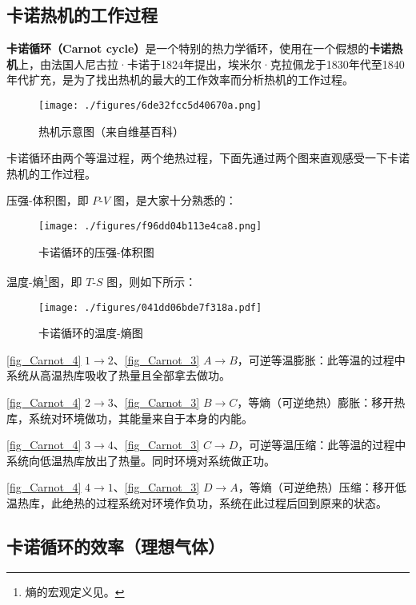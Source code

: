 


\subsection{卡诺热机的工作过程}
\textbf{卡诺循环（Carnot cycle）}是一个特别的热力学循环，使用在一个假想的\textbf{卡诺热机}上，由法国人尼古拉·卡诺于1824年提出，埃米尔·克拉佩龙于1830年代至1840年代扩充，是为了找出热机的最大的工作效率而分析热机的工作过程。

\begin{figure}[ht]
\centering
\texttt{[image: ./figures/6de32fcc5d40670a.png]}
\caption{热机示意图（来自维基百科）} \label{fig_Carnot_1}
\end{figure}
卡诺循环由两个等温过程，两个绝热过程，下面先通过两个图来直观感受一下卡诺热机的工作过程。

压强-体积图，即 $P$-$V$ 图，是大家十分熟悉的：

\begin{figure}[ht]
\centering
\texttt{[image: ./figures/f96dd04b113e4ca8.png]}
\caption{卡诺循环的压强-体积图} \label{fig_Carnot_4}
\end{figure}

温度-熵\footnote{熵的宏观定义见。}图，即 $T$-$S$ 图，则如下所示：
\begin{figure}[ht]
\centering
\texttt{[image: ./figures/041dd06bde7f318a.pdf]}
\caption{卡诺循环的温度-熵图} \label{fig_Carnot_3}
\end{figure}

\autoref{fig_Carnot_4} $1\to 2$、\autoref{fig_Carnot_3} $A\to B$，可逆等温膨胀：此等温的过程中系统从高温热库吸收了热量且全部拿去做功。

\autoref{fig_Carnot_4} $2\to 3$、\autoref{fig_Carnot_3} $B\to C$，等熵（可逆绝热）膨胀：移开热库，系统对环境做功，其能量来自于本身的内能。

\autoref{fig_Carnot_4} $3\to 4$、\autoref{fig_Carnot_3} $C\to D$，可逆等温压缩：此等温的过程中系统向低温热库放出了热量。同时环境对系统做正功。

\autoref{fig_Carnot_4} $4\to 1$、\autoref{fig_Carnot_3} $D\to A$，等熵（可逆绝热）压缩：移开低温热库，此绝热的过程系统对环境作负功，系统在此过程后回到原来的状态。

\subsection{卡诺循环的效率（理想气体）}

